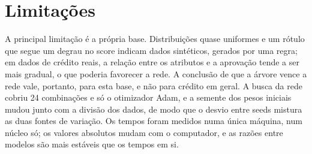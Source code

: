 \section{Limitações}\label{sec:limitacoes}

A principal limitação é a própria base. Distribuições quase uniformes e um rótulo que segue um degrau no score indicam dados sintéticos, gerados por uma regra; em dados de crédito reais, a relação entre os atributos e a aprovação tende a ser mais gradual, o que poderia favorecer a rede. A conclusão de que a árvore vence a rede vale, portanto, para esta base, e não para crédito em geral. A busca da rede cobriu 24 combinações e só o otimizador Adam, e a semente dos pesos iniciais mudou junto com a divisão dos dados, de modo que o desvio entre seeds mistura as duas fontes de variação. Os tempos foram medidos numa única máquina, num núcleo só; os valores absolutos mudam com o computador, e as razões entre modelos são mais estáveis que os tempos em si.
